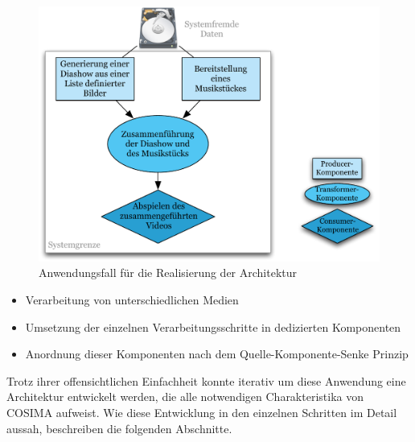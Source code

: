   \begin{figure}[!hb]
    \centering
      \includegraphics[width=.7\textwidth]{images/Santiago_Anwendungsfall.pdf}
    \caption{Anwendungsfall für die Realisierung der Architektur}
    \label{fig:images_Santiago_Anwendungsfall}
  \end{figure}
    
  \begin{itemize}
    \item Verarbeitung von unterschiedlichen Medien
    \item Umsetzung der einzelnen Verarbeitungsschritte in dedizierten Komponenten
    \item Anordnung dieser Komponenten nach dem Quelle-Komponente-Senke Prinzip
  \end{itemize}
  
  Trotz ihrer offensichtlichen Einfachheit konnte iterativ um diese Anwendung eine Architektur entwickelt werden, die alle notwendigen Charakteristika von COSIMA aufweist. Wie diese Entwicklung in den einzelnen Schritten im Detail aussah, beschreiben die folgenden Abschnitte.

  
